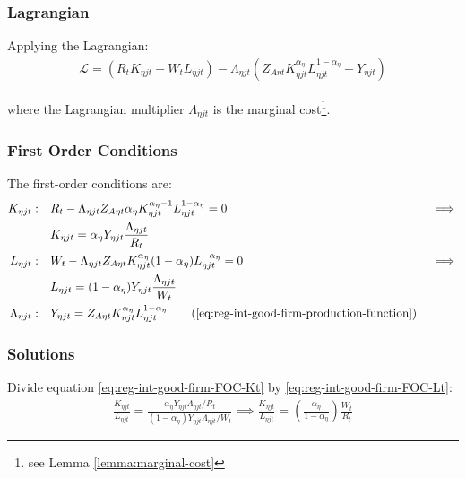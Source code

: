 \documentclass[
	thesis.tex
	]{subfiles}
\begin{document}
\subsubsection*{Lagrangian}

Applying the Lagrangian:
\begin{align}
	\label{eq:reg-int-good-firm-lagrangian}
	\mathcal{L} = (R_t K_{\eta jt} + W_t L_{\eta jt}) - \Lambda_{\eta jt} (Z_{A\eta t} K_{\eta jt}^{\alpha_\eta} L_{\eta jt}^{1-{\alpha_\eta}} - Y_{\eta jt})
\end{align}

where the Lagrangian multiplier $\Lambda_{\eta jt}$ is the marginal cost\footnote{see Lemma \ref{lemma:marginal-cost}}.

\subsubsection*{First Order Conditions}

The first-order conditions are:
\begin{alignat}{2}
	K_{\eta jt}: \quad & R_t - \Lambda_{\eta jt} Z_{A\eta t} {\alpha_\eta} K_{\eta jt}^{{\alpha_\eta}-1} L_{\eta jt}^{1-{\alpha_\eta}} = 0 &&\implies \nonumber \\
	& K_{\eta jt} = {\alpha_\eta} Y_{\eta jt} \frac{\Lambda_{\eta jt}}{R_t} \label{eq:reg-int-good-firm-FOC-Kt} \\
	L_{\eta jt}: \quad & W_t - \Lambda_{\eta jt} Z_{A\eta t} K_{\eta jt}^{\alpha_\eta} (1-{\alpha_\eta}) L_{\eta jt}^{-{\alpha_\eta}} = 0 \quad &&\implies \nonumber \\ 
	& L_{\eta jt} = (1-{\alpha_\eta}) Y_{\eta jt} \frac{\Lambda_{\eta jt}}{W_t} \label{eq:reg-int-good-firm-FOC-Lt} \\
	\Lambda_{\eta jt}: \quad & Y_{\eta jt} = Z_{A\eta t} K_{\eta jt}^{\alpha_\eta} L_{\eta jt}^{1-{\alpha_\eta}} \tag{\ref{eq:reg-int-good-firm-production-function}}
\end{alignat}

\subsubsection*{Solutions}

Divide equation \ref{eq:reg-int-good-firm-FOC-Kt} by \ref{eq:reg-int-good-firm-FOC-Lt}:
\begin{align}
	\frac{K_{\eta jt}}{L_{\eta jt}} = \frac{{\alpha_\eta} Y_{\eta jt} \Lambda_{\eta jt} /R_t}{(1-{\alpha_\eta}) Y_{\eta jt} \Lambda_{\eta jt} /W_t} \implies
	\frac{K_{\eta jt}}{L_{\eta jt}} = \left( \frac{{\alpha_\eta}}{1-{\alpha_\eta}} \right) \frac{W_t}{R_t} \label{eq:reg-int-good-firm-TMRS}
\end{align}
\end{document}
